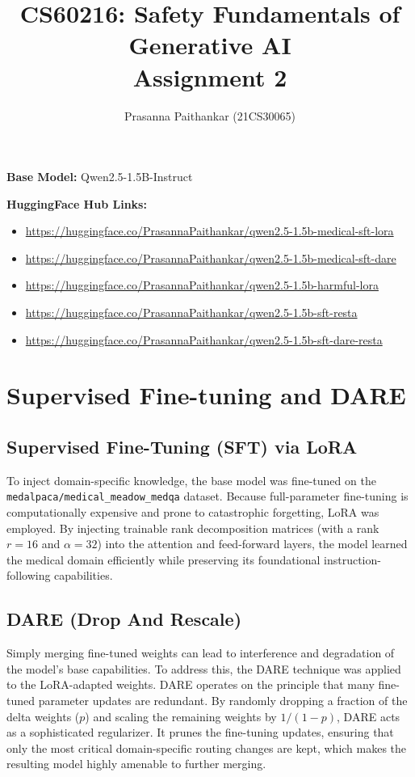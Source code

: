 \documentclass{article}
\title{CS60216: Safety Fundamentals of Generative AI\\
Assignment 2}
\author{Prasanna Paithankar (21CS30065)}
\date{}
\begin{document}
\maketitle

\textbf{Base Model:} Qwen2.5-1.5B-Instruct

\textbf{HuggingFace Hub Links:}
\begin{itemize}
    \item \url{https://huggingface.co/PrasannaPaithankar/qwen2.5-1.5b-medical-sft-lora}
    \item \url{https://huggingface.co/PrasannaPaithankar/qwen2.5-1.5b-medical-sft-dare}
    \item \url{https://huggingface.co/PrasannaPaithankar/qwen2.5-1.5b-harmful-lora}
    \item \url{https://huggingface.co/PrasannaPaithankar/qwen2.5-1.5b-sft-resta}
    \item \url{https://huggingface.co/PrasannaPaithankar/qwen2.5-1.5b-sft-dare-resta}
\end{itemize}


\section*{Supervised Fine-tuning and DARE}

\subsection*{Supervised Fine-Tuning (SFT) via LoRA}
To inject domain-specific knowledge, the base model was fine-tuned on the \texttt{medalpaca/medical\_meadow\_medqa} dataset. Because full-parameter fine-tuning is computationally expensive and prone to catastrophic forgetting, LoRA was employed. By injecting trainable rank decomposition matrices (with a rank $r=16$ and $\alpha=32$) into the attention and feed-forward layers, the model learned the medical domain efficiently while preserving its foundational instruction-following capabilities.

\subsection*{DARE (Drop And Rescale)}
Simply merging fine-tuned weights can lead to interference and degradation of the model's base capabilities. To address this, the DARE technique was applied to the LoRA-adapted weights. 
DARE operates on the principle that many fine-tuned parameter updates are redundant. By randomly dropping a fraction of the delta weights ($p$) and scaling the remaining weights by $1 / (1 - p)$, DARE acts as a sophisticated regularizer. It prunes the fine-tuning updates, ensuring that only the most critical domain-specific routing changes are kept, which makes the resulting model highly amenable to further merging.
\end{document}
